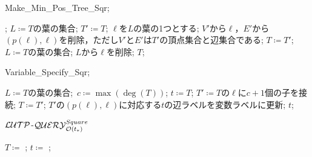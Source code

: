 \begin{algorithm}[tb]
\caption{{\sc Make\_Min\_Pos\_Tree\_Sqr};} \label{alg:lutp-query-square-step1}
\begin{algorithmic}[1]
  ;
    \State $L\coloneqq T$の葉の集合;
      \State $T'\coloneqq T$;
      \State $\ell$を$L$の葉の1つとする;
      \State $V'$から$\ell$，$E'$から$(p(\ell),\ell)$を削除，ただし$V'$と$E'$は$T'$の頂点集合と辺集合である;
        \State $T\coloneqq T'$;
        \State $L\coloneqq T$の葉の集合;
      \Else
        \State $L$から$\ell$を削除;
      \EndIf
    \EndWhile
    \State \Return $T$;
  \EndFunction
\end{algorithmic}
\end{algorithm}

\begin{algorithm}[tb]
\caption{{\sc Variable\_Specify\_Sqr};} \label{alg:lutp-query-square-step2}
\begin{algorithmic}[1]
    \State $L\coloneqq T$の葉の集合; \,$c\coloneqq \max(\deg(T))$;
    \State$t\coloneqq T$;
      \State $T'\coloneqq T$の$\ell$に$c+1$個の子を接続;
        \State $T\coloneqq T'$;
        \State $T'$の$(p(\ell),\ell)$に対応する$t$の辺ラベルを変数ラベルに更新;
      \EndIf
    \EndFor
    \State \Return $t$;
  \EndFunction
\end{algorithmic}
\end{algorithm}

\begin{algorithm}[tb]
\caption{${\cal LUTP}$-${\cal QUERY}_{{\cal O}(t_{\ast})}^{Square}$} \label{alg:lutp-query-square}
\begin{algorithmic}[1]
  \State $T\coloneqq $ ;
  \State $t\coloneqq $ ;
\end{algorithmic}
\end{algorithm}